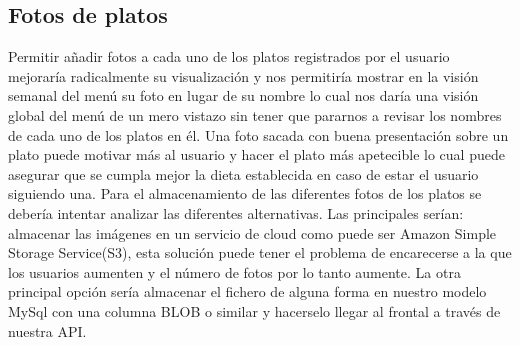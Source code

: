 \documentclass[12pt, a4paper, twoside]{book}
\begin{document}
	\subsection{Fotos de platos}
	Permitir añadir fotos a cada uno de los platos registrados por el usuario mejoraría radicalmente su visualización y nos permitiría mostrar en la visión semanal del menú su foto en lugar de su nombre lo cual nos daría una visión global del menú de un mero vistazo sin tener que pararnos a revisar los nombres de cada uno de los platos en él.
	Una foto sacada con buena presentación sobre un plato puede motivar más al usuario y hacer el plato más apetecible lo cual puede asegurar que se cumpla mejor la dieta establecida en caso de estar el usuario siguiendo una.
	Para el almacenamiento de las diferentes fotos de los platos se debería intentar analizar las diferentes alternativas. Las principales serían: almacenar las imágenes en un servicio de cloud como puede ser Amazon Simple Storage Service(S3), esta solución puede tener el problema de encarecerse a la que los usuarios aumenten y el número de fotos por lo tanto aumente. La otra principal opción sería almacenar el fichero de alguna forma en nuestro modelo MySql con una columna BLOB o similar y hacerselo llegar al frontal a través de nuestra API.
\end{document}
